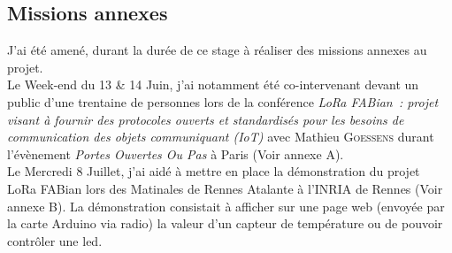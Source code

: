 \documentclass{article}
\begin{document}
\subsection{Missions annexes}
J'ai été amené, durant la durée de ce stage à réaliser des missions annexes au projet.\\
Le Week-end du 13 \& 14 Juin, j'ai notamment été co-intervenant devant un public d'une trentaine de personnes lors de la conférence \emph{LoRa FABian~:  projet visant à fournir des protocoles ouverts et standardisés pour les besoins de communication des objets communiquant (IoT)} avec Mathieu \textsc{Goessens} durant l'évènement \emph{Portes Ouvertes Ou Pas} à Paris (Voir annexe A).\\
Le Mercredi 8 Juillet, j'ai aidé à mettre en place la démonstration du projet LoRa FABian lors des Matinales de Rennes Atalante à l'\textsc{INRIA} de Rennes (Voir annexe B). La démonstration consistait à afficher sur une page web (envoyée par la carte Arduino via radio) la valeur d'un capteur de température ou de pouvoir contrôler une led.\\
\end{document}
